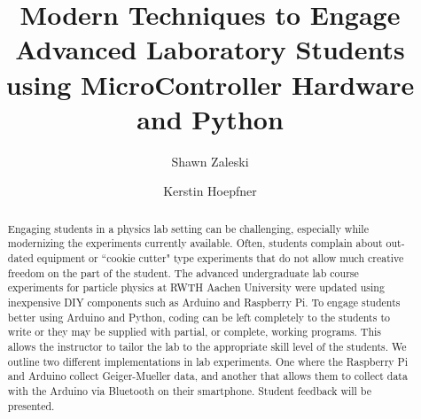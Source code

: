 \documentclass[12pt]{article}
\title{\textbf{Modern Techniques to Engage Advanced Laboratory Students using MicroController Hardware and Python}}
\author[1]{Shawn Zaleski}
\author[1]{Kerstin Hoepfner}
\affil[1]{III Physikalisches Institut A RWTH Aachen University}
\date{\empty}
\begin{document}
\maketitle
\noindent
\newline

\begin{abstract}
Engaging students in a physics lab setting can be challenging, especially while modernizing the experiments currently available. Often, students complain about out-dated equipment or ``cookie cutter" type experiments that do not allow much creative freedom on the part of the student. The advanced undergraduate lab course experiments for particle physics at RWTH Aachen University were updated using inexpensive DIY components such as Arduino and Raspberry Pi. To engage students better using Arduino and Python, coding can be left completely to the students to write or they may be supplied with partial, or complete, working programs. This allows the instructor to tailor the lab to the appropriate skill level of the students. We outline two different implementations in lab experiments. One where the Raspberry Pi and Arduino collect Geiger-Mueller data, and another that allows them to collect data with the Arduino via Bluetooth on their smartphone. Student feedback will be presented.

\end{abstract}

\newpage








\end{document}
